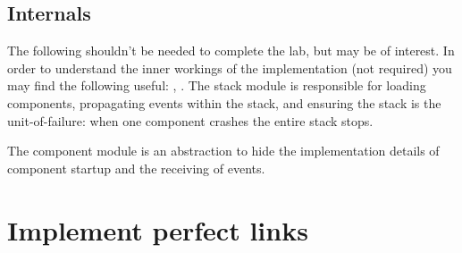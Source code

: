 \documentclass[a4paper]{article}
\begin{document}
%




\subsection{Internals} %
\label{sub:internals}

The following shouldn't be needed to complete the lab, but may be of interest.
In order to understand the inner workings of the implementation (not required)
you may find the following useful: \cite{man_gen_server},
\cite{lyse_client_server}. The stack module is responsible for loading
components, propagating events within the stack, and ensuring the stack is the
unit-of-failure: when one component crashes the entire stack stops.

The component module is an abstraction to hide the implementation details of
component startup and the receiving of events.






\section{Implement perfect links} %
\label{sub:implement_pl}
\end{document}
